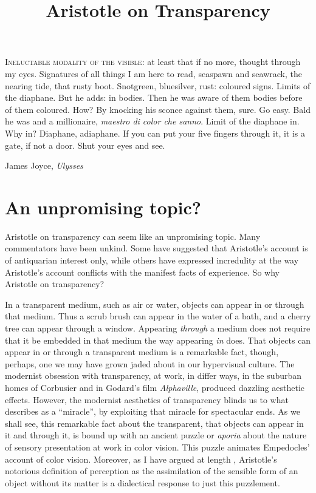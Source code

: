 \documentclass[12pt]{article}
\title{Aristotle on Transparency}
\author{\myauthor}
\date{} %
\begin{document}
\maketitle
\epigraph{\textsc{Ineluctable modality of the visible}: at least that if no more, thought through my eyes. Signatures of all things I am here to read, seaspawn and seawrack, the nearing tide, that rusty boot. Snotgreen, bluesilver, rust: coloured signs. Limits of the diaphane. But he adds: in bodies. Then he was aware of them bodies before of them coloured. How? By knocking his sconce against them, sure. Go easy. Bald he was and a millionaire, \emph{maestro di color che sanno}. Limit of the diaphane in. Why in? Diaphane, adiaphane. If you can put your five fingers through it, it is a gate, if not a door. Shut your eyes and see.}{James Joyce, \emph{Ulysses}}

\setlength{\parindent}{1em}


\section{An unpromising topic?} %
\label{sec:an_unpromising_topic_}

Aristotle on transparency can seem like an unpromising topic. Many commentators have been unkind. Some have suggested that Aristotle's account is of antiquarian interest only, while others have expressed incredulity at the way Aristotle's account conflicts with the manifest facts of experience. So why Aristotle on transparency?

In a transparent medium, such as air or water, objects can appear in or through that medium. Thus a scrub brush can appear in the water of a bath, and a cherry tree can appear through a window. Appearing \emph{through} a medium does not require that it be embedded in that medium the way appearing \emph{in} does. That objects can appear in or through a transparent medium is a remarkable fact, though, perhaps, one we may have grown jaded about in our hypervisual culture. The modernist obsession with transparency, at work, in differ ways, in the suburban homes of Corbusier and in Godard's film \emph{Alphaville}, produced dazzling aesthetic effects. However, the modernist aesthetics of transparency blinds us to what \citealt[168]{Bergson:1907sh} describes as a ``miracle'', by exploiting that miracle for spectacular ends. As we shall see, this remarkable fact about the transparent, that objects can appear in it and through it, is bound up with an ancient puzzle or \emph{aporia} about the nature of sensory presentation at work in color vision. This puzzle animates Empedocles' account of color vision. Moreover, as I have argued at length \citep{Kalderon:2015fr}, Aristotle's notorious definition of perception as the assimilation of the sensible form of an object without its matter is a dialectical response to just this puzzlement. 
\end{document}
